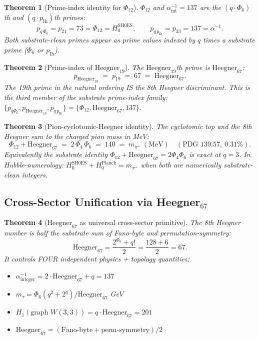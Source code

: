 \documentclass[11pt]{article}
\newtheorem{theorem}{Theorem}[section]
\begin{document}
\begin{theorem}[Prime-index identity for $\Phi_{12}$]\label{thm:prime_index_phi12}
$\Phi_{12}$ and $\alpha^{-1}_{\text{int}} = 137$ are the
$(q \cdot \Phi_6)$th and $(q \cdot p_{\mathrm{Ih}})$th primes:
\[
  p_{q\,\Phi_6} = p_{21} = 73 = \Phi_{12} = H_0^{\mathrm{SH0ES}},
  \qquad
  p_{q\,p_{\mathrm{Ih}}} = p_{33} = 137 = \alpha^{-1}.
\]
Both substrate-clean primes appear as prime values indexed by
$q$ times a substrate prime ($\Phi_6$ or $p_{\mathrm{Ih}}$).
\end{theorem}

\begin{theorem}[Prime-index of $\mathrm{Heegner}_{19}$]\label{thm:prime_heegner19}
The $\mathrm{Heegner}_{19}$th prime is $\mathrm{Heegner}_{67}$:
\[
  p_{\mathrm{Heegner}_{19}} \;=\; p_{19} \;=\; 67 \;=\; \mathrm{Heegner}_{67}.
\]
The 19th prime in the natural ordering IS the 8th Heegner
discriminant.  This is the third member of the substrate
prime-index family:
$\{p_{q\Phi_6}, p_{\mathrm{Heegner}_{19}}, p_{q\,p_{\mathrm{Ih}}}\}
 = \{\Phi_{12}, \mathrm{Heegner}_{67}, 137\}$.
\end{theorem}

\begin{theorem}[Pion-cyclotomic-Heegner identity]\label{thm:pion_phi_heeg}
The cyclotomic top and the 8th Heegner sum to the charged pion mass
in MeV:
\[
  \Phi_{12} + \mathrm{Heegner}_{67} \;=\; 2\,\Phi_4\,\Phi_6 \;=\; 140 \;=\; m_{\pi^+}~\mathrm{(MeV)}
  \quad (\text{PDG } 139.57,\ 0.31\%).
\]
Equivalently the substrate identity
$\Phi_{12} + \mathrm{Heegner}_{67} = 2\Phi_4\Phi_6$ is exact at $q=3$.
In Hubble-numerology: $H_0^{\mathrm{SH0ES}} + H_0^{\mathrm{Planck}} = m_{\pi^+}$
when both are numerically substrate-clean integers.
\end{theorem}

\subsection{Cross-Sector Unification via Heegner$_{67}$}

\begin{theorem}[$\mathrm{Heegner}_{67}$ as universal cross-sector primitive]\label{thm:heegner67}
The 8th Heegner number is half the substrate sum of Fano-byte and
permutation-symmetry:
\[
  \mathrm{Heegner}_{67} = \frac{2^{\Phi_6} + q!}{2} = \frac{128 + 6}{2} = 67.
\]
It controls FOUR independent physics + topology quantities:
\begin{itemize}[noitemsep]
  \item $\alpha^{-1}_{\text{integer}} = 2 \cdot \mathrm{Heegner}_{67} + q = 137$
  \item $m_\tau = \Phi_6 (q^2 + 2^q) / \mathrm{Heegner}_{67}$ GeV
  \item $H_1(\text{graph }W(3,3)) = q \cdot \mathrm{Heegner}_{67} = 201$
  \item $\mathrm{Heegner}_{67} = (\text{Fano-byte} + \text{perm-symmetry})/2$
\end{itemize}
\end{theorem}
\end{document}
